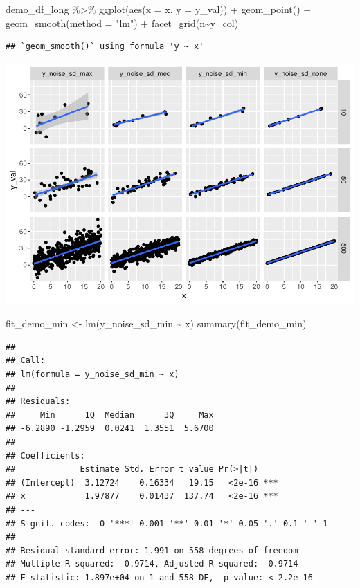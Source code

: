 \documentclass[
]{book}
\newenvironment{Shaded}{\begin{snugshade}}{\end{snugshade}}
\newcommand{\AttributeTok}[1]{\textcolor[rgb]{0.77,0.63,0.00}{#1}}
\newcommand{\FunctionTok}[1]{\textcolor[rgb]{0.00,0.00,0.00}{#1}}
\newcommand{\NormalTok}[1]{#1}
\newcommand{\OtherTok}[1]{\textcolor[rgb]{0.56,0.35,0.01}{#1}}
\newcommand{\SpecialCharTok}[1]{\textcolor[rgb]{0.00,0.00,0.00}{#1}}
\newcommand{\StringTok}[1]{\textcolor[rgb]{0.31,0.60,0.02}{#1}}
\begin{document}
\begin{Shaded}
\begin{Highlighting}[]
\NormalTok{demo\_df\_long }\SpecialCharTok{\%\textgreater{}\%} 
  \FunctionTok{ggplot}\NormalTok{(}\FunctionTok{aes}\NormalTok{(}\AttributeTok{x =}\NormalTok{ x, }\AttributeTok{y =}\NormalTok{ y\_val)) }\SpecialCharTok{+}
  \FunctionTok{geom\_point}\NormalTok{() }\SpecialCharTok{+}
  \FunctionTok{geom\_smooth}\NormalTok{(}\AttributeTok{method =} \StringTok{"lm"}\NormalTok{) }\SpecialCharTok{+} 
  \FunctionTok{facet\_grid}\NormalTok{(n}\SpecialCharTok{\textasciitilde{}}\NormalTok{y\_col)}
\end{Highlighting}
\end{Shaded}

\begin{verbatim}
## `geom_smooth()` using formula 'y ~ x'
\end{verbatim}

\includegraphics{test_course_notes_files/figure-latex/unnamed-chunk-85-1.pdf}

\begin{Shaded}
\begin{Highlighting}[]
\NormalTok{fit\_demo\_min }\OtherTok{\textless{}{-}} \FunctionTok{lm}\NormalTok{(y\_noise\_sd\_min }\SpecialCharTok{\textasciitilde{}}\NormalTok{ x)}
\FunctionTok{summary}\NormalTok{(fit\_demo\_min)}
\end{Highlighting}
\end{Shaded}

\begin{verbatim}
## 
## Call:
## lm(formula = y_noise_sd_min ~ x)
## 
## Residuals:
##     Min      1Q  Median      3Q     Max 
## -6.2890 -1.2959  0.0241  1.3551  5.6700 
## 
## Coefficients:
##             Estimate Std. Error t value Pr(>|t|)    
## (Intercept)  3.12724    0.16334   19.15   <2e-16 ***
## x            1.97877    0.01437  137.74   <2e-16 ***
## ---
## Signif. codes:  0 '***' 0.001 '**' 0.01 '*' 0.05 '.' 0.1 ' ' 1
## 
## Residual standard error: 1.991 on 558 degrees of freedom
## Multiple R-squared:  0.9714, Adjusted R-squared:  0.9714 
## F-statistic: 1.897e+04 on 1 and 558 DF,  p-value: < 2.2e-16
\end{verbatim}
\end{document}
